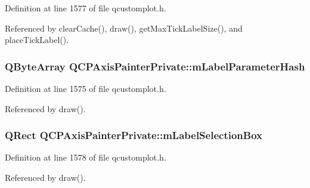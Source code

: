 Definition at line 1577 of file qcustomplot.\+h.



Referenced by clear\+Cache(), draw(), get\+Max\+Tick\+Label\+Size(), and place\+Tick\+Label().

\hypertarget{class_q_c_p_axis_painter_private_aab8be59df22ed4e43e3a6d511cbc466a}{}
\subsubsection[{m\+Label\+Parameter\+Hash}]{\setlength{\rightskip}{0pt plus 5cm}Q\+Byte\+Array Q\+C\+P\+Axis\+Painter\+Private\+::m\+Label\+Parameter\+Hash\hspace{0.3cm}{\ttfamily [protected]}}\label{class_q_c_p_axis_painter_private_aab8be59df22ed4e43e3a6d511cbc466a}


Definition at line 1575 of file qcustomplot.\+h.



Referenced by draw().

\hypertarget{class_q_c_p_axis_painter_private_abac9a47048d537f72ca147b6f29d30f1}{}
\subsubsection[{m\+Label\+Selection\+Box}]{\setlength{\rightskip}{0pt plus 5cm}Q\+Rect Q\+C\+P\+Axis\+Painter\+Private\+::m\+Label\+Selection\+Box\hspace{0.3cm}{\ttfamily [protected]}}\label{class_q_c_p_axis_painter_private_abac9a47048d537f72ca147b6f29d30f1}


Definition at line 1578 of file qcustomplot.\+h.



Referenced by draw().

\hypertarget{class_q_c_p_axis_painter_private_a882029a5f2d4abd71289d415c9b90a28}{}
